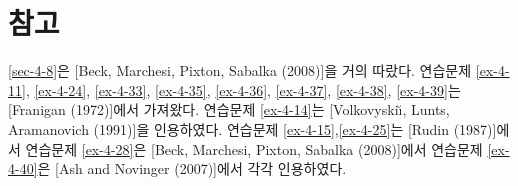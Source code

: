 \section{참고}

\ref{sec-4-8}은 [Beck, Marchesi, Pixton, Sabalka (2008)]을 거의 따랐다.
연습문제 \ref{ex-4-11}, \ref{ex-4-24}, \ref{ex-4-33}, \ref{ex-4-35}, \ref{ex-4-36},
\ref{ex-4-37}, \ref{ex-4-38}, \ref{ex-4-39}는 [Franigan (1972)]에서 가져왔다.
연습문제 \ref{ex-4-14}는 [Volkovyski\u{\i}, Lunts, Aramanovich (1991)]을 인용하였다.
연습문제 \ref{ex-4-15},\ref{ex-4-25}는 [Rudin (1987)]에서
연습문제 \ref{ex-4-28}은 [Beck, Marchesi, Pixton, Sabalka (2008)]에서
연습문제 \ref{ex-4-40}은 [Ash and Novinger (2007)]에서 각각 인용하였다.











